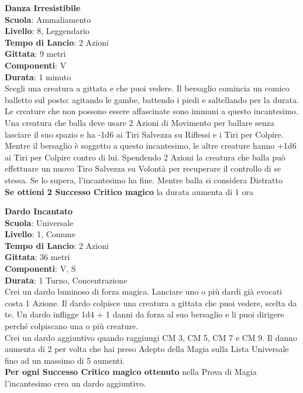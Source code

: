 \begin{multicols}{2}
\medskip\textbf{Danza Irresistibile}\\
\textbf{Scuola}: Ammaliamento\\
\textbf{Livello}: 8, Leggendario\\
\textbf{Tempo di Lancio}: 2 Azioni\\
\textbf{Gittata}: 9 metri\\
\textbf{Componenti}: V\\
\textbf{Durata}: 1 minuto\\
Scegli una creatura a gittata e che puoi vedere. Il bersaglio comincia un comico balletto sul posto: agitando le gambe, battendo i piedi e saltellando per la durata. Le creature che non possono essere affascinate sono immuni a questo incantesimo.\\
Una creatura che balla deve usare 2 Azioni di Movimento per ballare senza lasciare il suo spazio e ha -1d6 ai Tiri Salvezza su Riflessi e i Tiri per Colpire. Mentre il bersaglio è soggetto a questo incantesimo, le altre creature hanno +1d6 ai Tiri per Colpire contro di lui. Spendendo 2 Azioni la creatura che balla può effettuare un nuovo Tiro Salvezza su Volontà per recuperare il controllo di se stessa. Se lo supera, l'incantesimo ha fine. Mentre balla si considera Distratto\\
\textbf{Se ottieni 2 Successo Critico magico} la durata aumenta di 1 ora

\medskip\textbf{Dardo Incantato}\\
\textbf{Scuola}: Universale\\
\textbf{Livello}: 1, Comune\\
\textbf{Tempo di Lancio}: 2 Azioni\\
\textbf{Gittata}: 36 metri\\
\textbf{Componenti}: V, S\\
\textbf{Durata}: 1 Turno, Concentrazione\\
Crei un dardo luminoso di forza magica. Lanciare uno o più dardi già evocati costa 1 Azione. Il dardo colpisce una creatura a gittata che puoi vedere, scelta da te. Un dardo infligge 1d4 + 1 danni da forza al suo bersaglio e li puoi dirigere perché colpiscano una o più creature.\\
Crei un dardo aggiuntivo quando raggiungi CM 3, CM 5, CM 7 e CM 9. Il danno aumenta di 2 per volta che hai preso Adepto della Magia sulla Lista Universale fino ad un massimo di 5 aumenti.\\
\textbf{Per ogni Successo Critico magico ottenuto} nella Prova di Magia l'incantesimo crea un dardo aggiuntivo.


\end{multicols}
